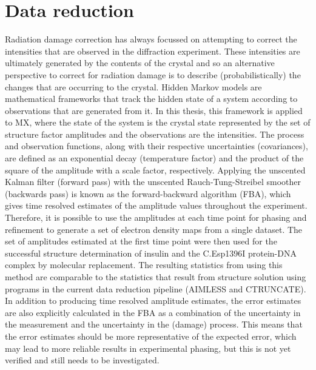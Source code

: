 \section{Data reduction}
\label{sec:Data Reduction}
Radiation damage correction has always focussed on attempting to correct the intensities that are observed in the diffraction experiment.
These intensities are ultimately generated by the contents of the crystal and so an alternative perspective to correct for radiation damage is to describe (probabilistically) the changes that are occurring to the crystal.
Hidden Markov models are mathematical frameworks that track the hidden state of a system according to observations that are generated from it.
In this thesis, this framework is applied to MX, where the state of the system is the crystal state represented by the set of structure factor amplitudes and the observations are the intensities.
The process and observation functions, along with their respective uncertainties (covariances), are defined as an exponential decay (temperature factor) and the product of the square of the amplitude with a scale factor, respectively.
Applying the unscented Kalman filter (forward pass) with the unscented Rauch-Tung-Streibel smoother (backwards pass) is known as the forward-backward algorithm (FBA), which gives time resolved estimates of the amplitude values throughout the experiment.
Therefore, it is possible to use the amplitudes at each time point for phasing and refinement to generate a set of electron density maps from a single dataset.
The set of amplitudes estimated at the first time point were then used for the successful structure determination of insulin and the C.Esp1396I protein-DNA complex by molecular replacement.
The resulting statistics from using this method are comparable to the statistics that result from structure solution using programs in the current data reduction pipeline (AIMLESS and CTRUNCATE).
In addition to producing time resolved amplitude estimates, the error estimates are also explicitly calculated in the FBA as a combination of the uncertainty in the measurement and the uncertainty in the (damage) process.
This means that the error estimates should be more representative of the expected error, which may lead to more reliable results in experimental phasing, but this is not yet verified and still needs to be investigated.

